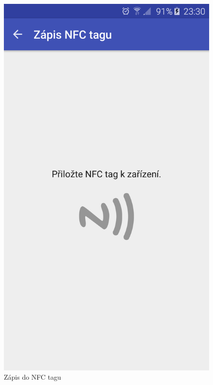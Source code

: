 \documentclass{article}
\begin{document}
\begin{figure}[H]
\begin{minipage}{.5\textwidth}
\centering
                \includegraphics[scale=0.14]{img/screen/zapisnfcdetail.png}
        \caption{Zápis do NFC tagu}
        \label{fig:nfczapis}
\end{minipage}
\begin{minipage}{.5\textwidth}
    \centering

\end{minipage}
\end{figure}
\end{document}
